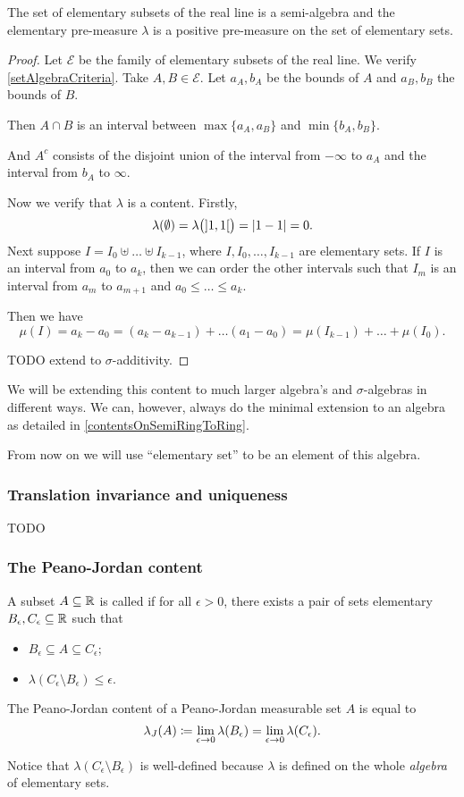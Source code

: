 \begin{lemma}
The set of elementary subsets of the real line is a semi-algebra and the elementary pre-measure $\lambda$ is a positive pre-measure on the set of elementary sets.
\end{lemma}
\begin{proof}
Let $\mathcal{E}$ be the family of elementary subsets of the real line. We verify \ref{setAlgebraCriteria}. Take $A,B\in \mathcal{E}$. Let $a_A,b_A$ be the bounds of $A$ and $a_B, b_B$ the bounds of $B$.

Then $A\cap B$ is an interval between $\max\{a_A, a_B\}$ and $\min\{b_A, b_B\}$.

And $A^c$ consists of the disjoint union of the interval from $-\infty$ to $a_A$ and the interval from $b_A$ to $\infty$.

Now we verify that $\lambda$ is a content. Firstly,
\[ \lambda(\emptyset) = \lambda\big(\interval[o]{1,1}\big) = |1-1| = 0. \]
Next suppose $I = I_0\uplus \ldots \uplus I_{k-1}$, where $I,I_0,\ldots, I_{k-1}$ are elementary sets. If $I$ is an interval from $a_0$ to $a_k$, then we can order the other intervals such that $I_m$ is an interval from $a_m$ to $a_{m+1}$ and $a_0 \leq \ldots \leq a_k$.

Then we have
\[ \mu(I) = a_k - a_0 = (a_k - a_{k-1}) + \ldots (a_1 - a_0) = \mu(I_{k-1}) + \ldots + \mu(I_0). \]


TODO extend to $\sigma$-additivity.
\end{proof}

We will be extending this content to much larger algebra's and $\sigma$-algebras in different ways. We can, however, always do the minimal extension to an algebra as detailed in \ref{contentsOnSemiRingToRing}.

From now on we will use ``elementary set'' to be an element of this algebra.

\subsubsection{Translation invariance and uniqueness}
TODO

\subsubsection{The Peano-Jordan content}
\begin{definition}
A subset $A\subseteq \mathbb{R}$ is called  if for all $\epsilon > 0$, there exists a pair of sets elementary $B_\epsilon, C_\epsilon \subseteq \mathbb{R}$ such that
\begin{itemize}
\item $B_\epsilon \subseteq A\subseteq C_\epsilon$;
\item $\lambda(C_\epsilon \setminus B_\epsilon) \leq \epsilon$.
\end{itemize}
The Peano-Jordan content of a Peano-Jordan measurable set $A$ is equal to
\[ \lambda_J(A) \coloneqq \lim_{\epsilon\to 0}\lambda(B_\epsilon) = \lim_{\epsilon\to 0}\lambda(C_\epsilon). \]
\end{definition}
Notice that $\lambda(C_\epsilon \setminus B_\epsilon)$ is well-defined because $\lambda$ is defined on the whole \emph{algebra} of elementary sets.


